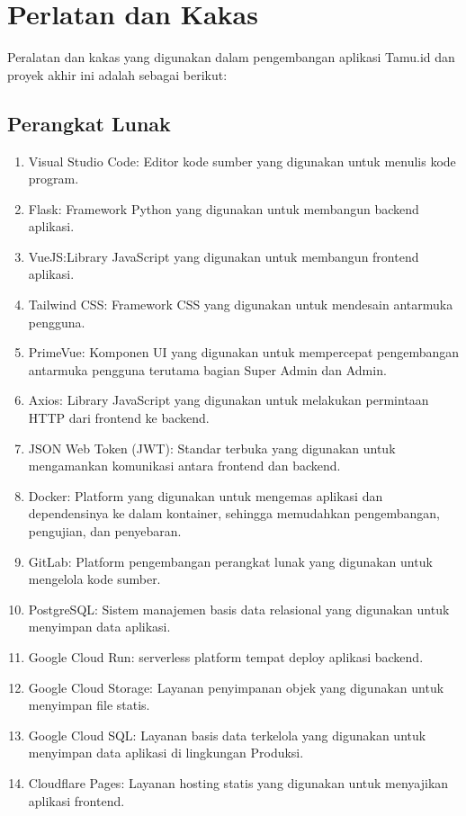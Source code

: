 \section{Perlatan dan Kakas}

Peralatan dan kakas yang digunakan dalam pengembangan aplikasi Tamu.id dan proyek akhir ini adalah sebagai berikut:

\subsection{Perangkat Lunak}

\begin{enumerate}
    \item Visual Studio Code: Editor kode sumber yang digunakan untuk menulis kode program.
    \item Flask: Framework Python yang digunakan untuk membangun backend aplikasi.
    \item VueJS:Library JavaScript yang digunakan untuk membangun frontend aplikasi.
    \item Tailwind CSS: Framework CSS yang digunakan untuk mendesain antarmuka pengguna.
    \item PrimeVue: Komponen UI yang digunakan untuk mempercepat pengembangan antarmuka pengguna terutama bagian Super Admin dan Admin.
    \item Axios: Library JavaScript yang digunakan untuk melakukan permintaan HTTP dari frontend ke backend.
    \item JSON Web Token (JWT): Standar terbuka yang digunakan untuk mengamankan komunikasi antara frontend dan backend.
    \item Docker: Platform yang digunakan untuk mengemas aplikasi dan dependensinya ke dalam kontainer, sehingga memudahkan pengembangan, pengujian, dan penyebaran.
    \item GitLab: Platform pengembangan perangkat lunak yang digunakan untuk mengelola kode sumber.
    \item PostgreSQL: Sistem manajemen basis data relasional yang digunakan untuk menyimpan data aplikasi.
    \item Google Cloud Run: serverless platform tempat deploy aplikasi backend.
    \item Google Cloud Storage: Layanan penyimpanan objek yang digunakan untuk menyimpan file statis.
    \item Google Cloud SQL: Layanan basis data terkelola yang digunakan untuk menyimpan data aplikasi di lingkungan Produksi.
    \item Cloudflare Pages: Layanan hosting statis yang digunakan untuk menyajikan aplikasi frontend.

\end{enumerate}

